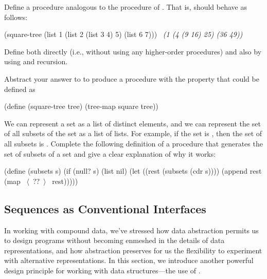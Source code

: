 \begin{exerciseGroup}
\label{Exercise 2.30}
 Define a procedure
 analogous to the  procedure of
.  That is,  should behave as follows:

\begin{codeBlock}
(square-tree
 (list 1
       (list 2 (list 3 4) 5)
       (list 6 7)))
~\textit{(1 (4 (9 16) 25) (36 49))}~
\end{codeBlock}

Define  both directly (i.e., without using any higher-order
procedures) and also by using  and recursion.

\label{Exercise 2.31}
 Abstract your answer to
 to produce a procedure  with the property
that  could be defined as

\begin{codeBlock}
(define (square-tree tree) (tree-map square tree))
\end{codeBlock}

\label{Exercise 2.32}
 We can represent a set as a list
of distinct elements, and we can represent the set of all subsets of the set as
a list of lists.  For example, if the set is , then the set of
all subsets is .  Complete the
following definition of a procedure that generates the set of subsets of a set
and give a clear explanation of why it works:

\begin{codeBlock}
(define (subsets s)
  (if (null? s)
      (list nil)
      (let ((rest (subsets (cdr s))))
        (append rest (map ~\(\langle \)~??~\(\rangle \)~ rest)))))
\end{codeBlock}
\end{exerciseGroup}

\subsection{Sequences as Conventional Interfaces}
\label{Section 2.2.3}

In working with compound data, we've stressed how data abstraction permits us
to design programs without becoming enmeshed in the details of data
representations, and how abstraction preserves for us the flexibility to
experiment with alternative representations.  In this section, we introduce
another powerful design principle for working with data structures---the use of
.

